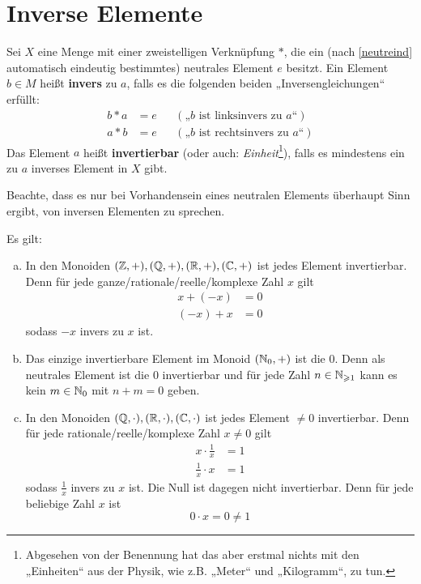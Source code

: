 \section{Inverse Elemente}



\begin{de} \label{inverse}
Sei $X$ eine Menge mit einer zweistelligen Verknüpfung $*$, die ein (nach \cref{neutreind} automatisch eindeutig bestimmtes) neutrales Element $e$ besitzt. Ein Element $b\in M$ heißt \textbf{invers} zu $a$, falls es die folgenden beiden „Inversengleichungen“ erfüllt:
\begin{align*}
 b*a & = e && (\text{„$b$ ist linksinvers zu $a$“})\\
 a*b & = e && (\text{„$b$ ist rechtsinvers zu $a$“})
\end{align*}
Das Element $a$ heißt \textbf{invertierbar} (oder auch: \emph{Einheit}\footnote{Abgesehen von der Benennung hat das aber erstmal nichts mit den „Einheiten“ aus der Physik, wie z.B. „Meter“ und „Kilogramm“, zu tun.}), falls es mindestens ein zu $a$ inverses Element in $X$ gibt.
\end{de}



\begin{bem}
Beachte, dass es nur bei Vorhandensein eines neutralen Elements überhaupt Sinn ergibt, von inversen Elementen zu sprechen. 
\end{bem}




\begin{bsp}
 Es gilt:
 \begin{enumerate}[a)]
  \item In den Monoiden $({\mathbb Z},+),({\mathbb Q},+),({\mathbb R},+),({\mathbb C},+)$ ist jedes Element invertierbar. Denn für jede ganze/rationale/reelle/komplexe Zahl $x$ gilt
  \begin{align*}
   x + (-x) & = 0 \\
   (-x) + x & = 0
  \end{align*}
  sodass $-x$ invers zu $x$ ist.
  \item Das einzige invertierbare Element im Monoid $({\mathbb N}_0,+)$ ist die $0$. Denn als neutrales Element ist die $0$ invertierbar und für jede Zahl $n\in {\mathbb N}_{\geqslant 1}$ kann es kein $m\in {\mathbb N}_0$ mit $n+m=0$ geben.
  \item \label{inversebsp} In den Monoiden $({\mathbb Q},\cdot),({\mathbb R},\cdot),({\mathbb C},\cdot)$ ist jedes Element $\neq 0$ invertierbar. Denn für jede rationale/reelle/komplexe Zahl $x\neq 0$ gilt
  \begin{align*}
   x \cdot \frac{1}{x} & = 1 \\
   \frac{1}{x}\cdot x & = 1
  \end{align*}
  sodass $\frac{1}{x}$ invers zu $x$ ist. Die Null ist dagegen nicht invertierbar. Denn für jede beliebige Zahl $x$ ist
  \[ 0\cdot x = 0 \neq 1 \]
 \end{enumerate}
\end{bsp}




